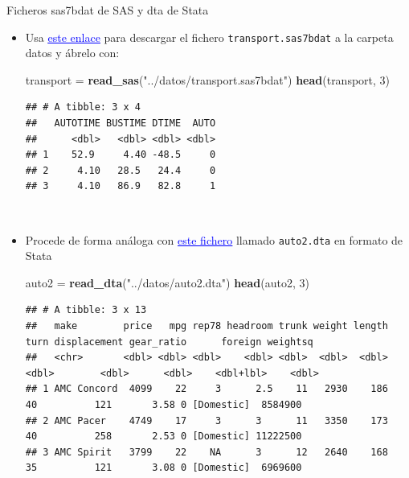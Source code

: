 \documentclass[
  9pt,
  ignorenonframetext,
]{beamer}
\newenvironment{Shaded}{\begin{snugshade}}{\end{snugshade}}
\newcommand{\DecValTok}[1]{\textcolor[rgb]{0.00,0.00,0.81}{#1}}
\newcommand{\KeywordTok}[1]{\textcolor[rgb]{0.13,0.29,0.53}{\textbf{#1}}}
\newcommand{\NormalTok}[1]{#1}
\newcommand{\StringTok}[1]{\textcolor[rgb]{0.31,0.60,0.02}{#1}}
\begin{document}
\begin{frame}[fragile]

\begin{block}{Ficheros sas7bdat de SAS y dta de Stata}

\begin{itemize}
\item
  Usa
  \href{http://www.principlesofeconometrics.com/sas/transport.sas7bdat}{\textcolor{blue}{\underline{este enlace}}}
  para descargar el fichero \texttt{transport.sas7bdat} a la carpeta
  datos y ábrelo con: \scriptsize

\begin{Shaded}
\begin{Highlighting}[]
\NormalTok{transport =}\StringTok{ }\KeywordTok{read_sas}\NormalTok{(}\StringTok{"../datos/transport.sas7bdat"}\NormalTok{)}
\KeywordTok{head}\NormalTok{(transport, }\DecValTok{3}\NormalTok{) }
\end{Highlighting}
\end{Shaded}

\begin{verbatim}
## # A tibble: 3 x 4
##   AUTOTIME BUSTIME DTIME  AUTO
##      <dbl>   <dbl> <dbl> <dbl>
## 1    52.9     4.40 -48.5     0
## 2     4.10   28.5   24.4     0
## 3     4.10   86.9   82.8     1
\end{verbatim}
\end{itemize}

\normalsize

\({ }\)

\begin{itemize}
\item
  Procede de forma análoga con
  \href{http://www.stata-press.com/data/r8/auto2.dta}{\textcolor{blue}{\underline{este fichero}}}
  llamado \texttt{auto2.dta} en formato de Stata\\
  \tiny

\begin{Shaded}
\begin{Highlighting}[]
\NormalTok{auto2 =}\StringTok{ }\KeywordTok{read_dta}\NormalTok{(}\StringTok{"../datos/auto2.dta"}\NormalTok{)}
\KeywordTok{head}\NormalTok{(auto2, }\DecValTok{3}\NormalTok{) }
\end{Highlighting}
\end{Shaded}

\begin{verbatim}
## # A tibble: 3 x 13
##   make        price   mpg rep78 headroom trunk weight length  turn displacement gear_ratio      foreign weightsq
##   <chr>       <dbl> <dbl> <dbl>    <dbl> <dbl>  <dbl>  <dbl> <dbl>        <dbl>      <dbl>    <dbl+lbl>    <dbl>
## 1 AMC Concord  4099    22     3      2.5    11   2930    186    40          121       3.58 0 [Domestic]  8584900
## 2 AMC Pacer    4749    17     3      3      11   3350    173    40          258       2.53 0 [Domestic] 11222500
## 3 AMC Spirit   3799    22    NA      3      12   2640    168    35          121       3.08 0 [Domestic]  6969600
\end{verbatim}
\end{itemize}


\end{block}
\end{frame}
\end{document}
